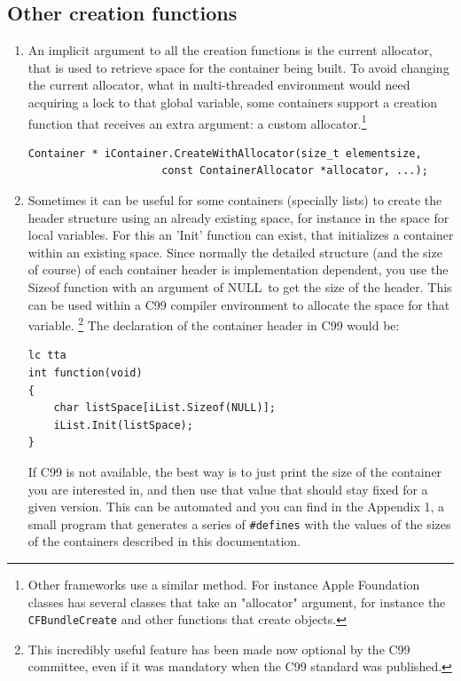 \documentclass[12pt,a4paper]{memoir} %
\newif\iftth
\newcommand{\Null}{{\iftth \ NULL \else \footnotesize NULL\  \fi}}
\begin{document}
\subsection{Other creation functions}
\begin{enumerate}
\item
An implicit argument to all the creation functions is the current allocator, that is used to retrieve space for the container being built. To avoid changing the current allocator, what in multi-threaded environment would need acquiring a lock to that global variable, some containers support a creation function that receives an extra argument: a custom allocator.\footnote{
Other frameworks use a similar method. For instance Apple Foundation classes has several classes that take an "allocator" argument, for instance the
\texttt{CFBundleCreate} and other functions that create objects.
}
\begin{verbatim}
Container * iContainer.CreateWithAllocator(size_t elementsize,
                     const ContainerAllocator *allocator, ...);
\end{verbatim}
\item
Sometimes it can be useful for some containers (specially lists) to create the  header structure using an already existing space, for instance in the space for local variables. For this an 'Init' function can exist, that initializes a container within an existing space.
Since normally the detailed structure (and the size of course) of each container header is implementation dependent, you use the Sizeof function with an argument of \Null to get the size of the header. This can be used within a C99 compiler environment to allocate the space for that variable.
\footnote{This incredibly useful feature has been made now optional by the C99 committee, even if it was mandatory when the C99 standard was published.}
The declaration of the container header in C99 would be:
\begin{verbatim}lc tta
int function(void)
{
    char listSpace[iList.Sizeof(NULL)];
    iList.Init(listSpace);
}
\end{verbatim}

If C99 is not available, the best way is to just print the size of the container you are interested in, and then use that value that should stay fixed 
for a given version. This can be automated and you can find in the Appendix 1, a small program that generates a series of \texttt{\#defines} with the 
values of the sizes of the containers described in this documentation.


\end{enumerate}
\end{document}
